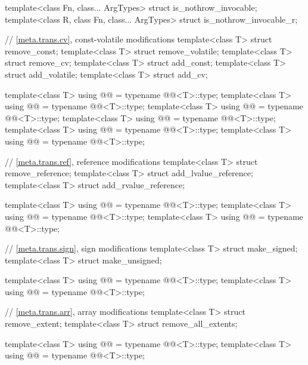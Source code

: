 \begin{codeblock}
{  template<class Fn, class... ArgTypes> struct is_nothrow_invocable;
  template<class R, class Fn, class... ArgTypes> struct is_nothrow_invocable_r;

  // \ref{meta.trans.cv}, const-volatile modifications
  template<class T> struct remove_const;
  template<class T> struct remove_volatile;
  template<class T> struct remove_cv;
  template<class T> struct add_const;
  template<class T> struct add_volatile;
  template<class T> struct add_cv;

  template<class T>
    using @@    = typename @@<T>::type;
  template<class T>
    using @@ = typename @@<T>::type;
  template<class T>
    using @@       = typename @@<T>::type;
  template<class T>
    using @@       = typename @@<T>::type;
  template<class T>
    using @@    = typename @@<T>::type;
  template<class T>
    using @@          = typename @@<T>::type;

  // \ref{meta.trans.ref}, reference modifications
  template<class T> struct remove_reference;
  template<class T> struct add_lvalue_reference;
  template<class T> struct add_rvalue_reference;

  template<class T>
    using @@     = typename @@<T>::type;
  template<class T>
    using @@ = typename @@<T>::type;
  template<class T>
    using @@ = typename @@<T>::type;

  // \ref{meta.trans.sign}, sign modifications
  template<class T> struct make_signed;
  template<class T> struct make_unsigned;

  template<class T>
    using @@   = typename @@<T>::type;
  template<class T>
    using @@ = typename @@<T>::type;

  // \ref{meta.trans.arr}, array modifications
  template<class T> struct remove_extent;
  template<class T> struct remove_all_extents;

  template<class T>
    using @@      = typename @@<T>::type;
  template<class T>
    using @@ = typename @@<T>::type;

}
\end{codeblock}
